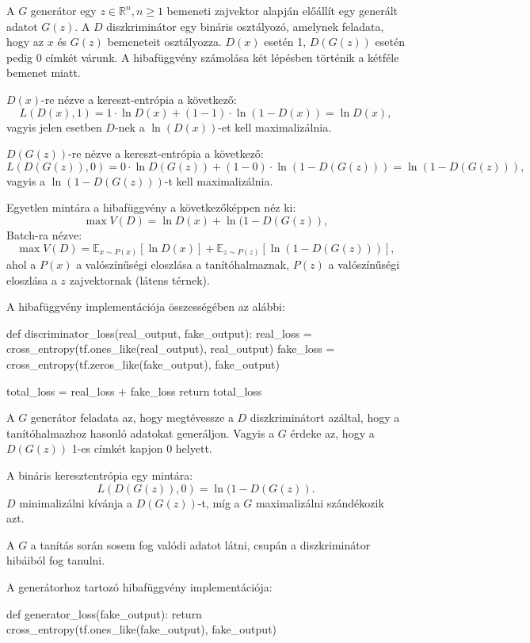 
A $G$ generátor egy $z \in \mathbb{R}^n, n \geq 1$ bemeneti zajvektor alapján előállít egy generált adatot $G(z)$.
A $D$ diszkriminátor egy bináris osztályozó, amelynek feladata, hogy az $x$ és $G(z)$ bemeneteit osztályozza.
$D(x)$ esetén 1, $D(G(z))$ esetén pedig 0 címkét várunk.
A hibafüggvény számolása két lépésben történik a kétféle bemenet miatt.

$D(x)$-re nézve a kereszt-entrópia a következő:
$$L(D(x), 1) = 1 \cdot \ln D(x) + (1 - 1) \cdot \ln(1 - D(x)) = \ln D(x),$$
vagyis jelen esetben $D$-nek a $\ln(D(x))$-et kell maximalizálnia.

$D(G(z))$-re nézve a kereszt-entrópia a következő:
$$L(D(G(z)), 0) = 0 \cdot \ln D(G(z)) + (1 - 0) \cdot \ln(1 - D(G(z))) = \ln(1- D(G(z))),$$
vagyis a $\ln(1 - D(G(z)))$-t kell maximalizálnia.

Egyetlen mintára a hibafüggvény a következőképpen néz ki:
$$\max V(D) = \ln D(x) + \ln(1 - D(G(z)),$$
Batch-ra nézve:
$$\max V(D) = \mathbb{E}_{x \sim P(x)} \left[\ln D(x) \right] + \mathbb{E}_{z \sim P(z)} \left[\ln(1 - D(G(z))) \right],$$
ahol a $P(x)$ a valószínűségi eloszlása a tanítóhalmaznak, $P(z)$ a valószínűségi eloszlása a $z$ zajvektornak (látens térnek).

A hibafüggvény implementációja összességében az alábbi:
\begin{python}
def discriminator_loss(real_output, fake_output):
    real_loss = cross_entropy(tf.ones_like(real_output), real_output)
    fake_loss = cross_entropy(tf.zeros_like(fake_output), fake_output)
    
    total_loss = real_loss + fake_loss
    return total_loss
\end{python}


A $G$ generátor feladata az, hogy megtévessze a $D$ diszkriminátort azáltal, hogy a tanítóhalmazhoz hasonló adatokat generáljon.
Vagyis a $G$ érdeke az, hogy a $D(G(z))$ 1-es címkét kapjon 0 helyett.

A bináris keresztentrópia egy mintára:
$$L(D(G(z)), 0) = \ln(1 - D(G(z)).$$
$D$ minimalizálni kívánja a $D(G(z))$-t, míg a $G$ maximalizálni szándékozik azt.

A $G$ a tanítás során sosem fog valódi adatot látni, csupán a diszkriminátor hibáiból fog tanulni.

A generátorhoz tartozó hibafüggvény implementációja:
\begin{python}
def generator_loss(fake_output):
    return cross_entropy(tf.ones_like(fake_output), fake_output)
\end{python}

